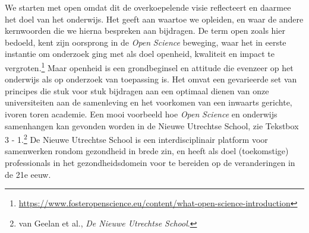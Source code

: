 \documentclass[smallauthor, chapterhaspagenum, nochapterinheader, pagenuminheader,  bigchapnum,medium2, tocpages, garamond, titleinheader]{jote-book}
\begin{document}
	We starten met open omdat dit de overkoepelende visie reflecteert en daarmee het doel van het onderwijs. Het geeft aan waartoe we opleiden, en waar de andere kernwoorden die we hierna bespreken aan bijdragen. De term open zoals hier bedoeld, kent zijn oorsprong in de \emph{Open }\emph{Science} beweging, waar het in eerste instantie om onderzoek ging met als doel openheid, kwaliteit en impact te vergroten.\footnote{\href{https://www.fosteropenscience.eu/content/what-open-science-introduction}{https://www.fosteropenscience.eu/content/what-open-science-introduction} } Maar openheid is een grondbeginsel en attitude die evenzeer op het onderwijs als op onderzoek van toepassing is. Het omvat een gevarieerde set van principes die stuk voor stuk bijdragen aan een optimaal dienen van onze universiteiten aan de samenleving en het voorkomen van een inwaarts gerichte, ivoren toren academie. Een mooi voorbeeld hoe \emph{Open }\emph{Science} en onderwijs samenhangen kan gevonden worden in de Nieuwe Utrechtse School, zie Tekstbox 3 - 1.\footnote{van Geelan et al., \emph{De Nieuwe Utrechtse School}.} De Nieuwe Utrechtse School is een interdisciplinair platform voor samenwerken rondom gezondheid in brede zin, en heeft als doel (toekomstige) professionals in het gezondheidsdomein voor te bereiden op de veranderingen in de 21e eeuw.
\end{document}
